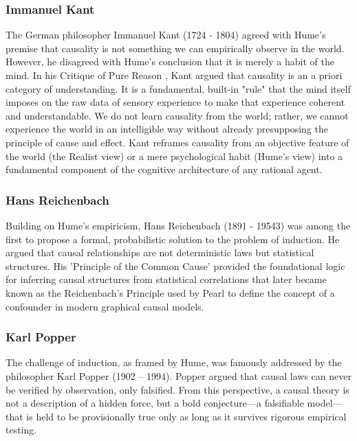 \subsubsection{Immanuel Kant}

The German philosopher Immanuel Kant (1724 - 1804) agreed with Hume's premise that causality is not something we can empirically observe in the world. However, he disagreed with Hume's conclusion that it is merely a habit of the mind. In his Critique of Pure Reason \cite{kant2024critique}, Kant argued that causality is an a priori category of understanding. It is a fundamental, built-in "rule" that the mind itself imposes on the raw data of sensory experience to make that experience coherent and understandable. We do not learn causality from the world; rather, we cannot experience the world in an intelligible way without already presupposing the principle of cause and effect. Kant reframes causality from an objective feature of the world (the Realist view) or a mere psychological habit (Hume's view) into a fundamental component of the cognitive architecture of any rational agent. 

\subsubsection{Hans Reichenbach}

Building on Hume's empiricism, Hans Reichenbach (1891 - 19543) was among the first to propose a formal, probabilistic solution to the problem of induction. He argued that causal relationships are not deterministic laws but statistical structures. His 'Principle of the Common Cause' provided the foundational logic for inferring causal structures from statistical correlations\cite{reichenbach1991direction} that later became known as the Reichenbach's Principle used by Pearl to define the concept of a confounder in modern graphical causal models\cite{pearl2000causality}.

\subsubsection{Karl Popper}

The challenge of induction, as framed by Hume, was famously addressed by the philosopher Karl Popper  (1902 – 1994). Popper argued that causal laws can never be verified by observation, only falsified. From this perspective, a causal theory is not a description of a hidden force, but a bold conjecture—a falsifiable model—that is held to be provisionally true only as long as it survives rigorous empirical testing\cite{popper2005logic}.


